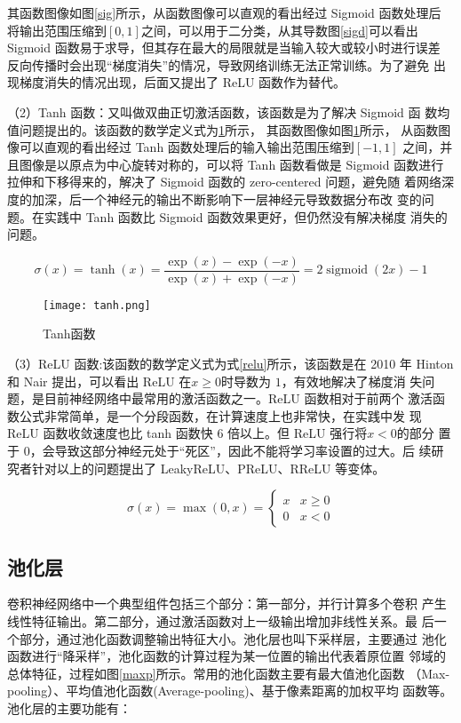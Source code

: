 其函数图像如图\ref{sig}所示，从函数图像可以直观的看出经过 Sigmoid 函数处理后
将输出范围压缩到$[0,1]$之间，可以用于二分类，从其导数图\ref{sigd}可以看出
Sigmoid 函数易于求导，但其存在最大的局限就是当输入较大或较小时进行误差
反向传播时会出现“梯度消失”的情况，导致网络训练无法正常训练。为了避免
出现梯度消失的情况出现，后面又提出了 ReLU 函数作为替代。

（2）Tanh 函数：又叫做双曲正切激活函数，该函数是为了解决 Sigmoid 函
数均值问题提出的。该函数的数学定义式为\ref{tanh}所示，
其函数图像如图\ref{tanh}所示，
从函数图像可以直观的看出经过 Tanh 函数处理后的输入输出范围压缩到$[-1,1]$
之间，并且图像是以原点为中心旋转对称的，可以将 Tanh 函数看做是 Sigmoid
函数进行拉伸和下移得来的，解决了 Sigmoid 函数的 zero-centered 问题，避免随
着网络深度的加深，后一个神经元的输出不断影响下一层神经元导致数据分布改
变的问题。在实践中 Tanh 函数比 Sigmoid 函数效果更好，但仍然没有解决梯度
消失的问题。

\begin{equation}
    \sigma(x)=\tanh (x)=\frac{\exp (x)-\exp (-x)}{\exp (x)+\exp (-x)}=2 \operatorname{sigmoid}(2 x)-1
    \label{tan}
\end{equation}

\begin{figure}[htbp]
    \centering
    \texttt{[image: tanh.png]}
    \caption{Tanh函数}
    \label{tanh}
\end{figure}

（3）ReLU 函数:该函数的数学定义式为式\ref{relu}所示，该函数是在 2010 年
Hinton 和 Nair 提出，可以看出 ReLU 在$x\ge 0$时导数为 $1$，有效地解决了梯度消
失问题，是目前神经网络中最常用的激活函数之一\cite{xu2015empirical}。ReLU 函数相对于前两个
激活函数公式非常简单，是一个分段函数，在计算速度上也非常快，在实践中发
现 ReLU 函数收敛速度也比 tanh 函数快 6 倍以上。但 ReLU 强行将$ x<0$的部分
置于 0，会导致这部分神经元处于“死区”，因此不能将学习率设置的过大。后
续研究者针对以上的问题提出了 LeakyReLU\cite{maas2013rectifier}、PReLU、RReLU 等变体。

\begin{equation}
    \sigma(x)=\max (0, x)= \begin{cases}x & x \geq 0 \\ 0 & x<0\end{cases}
    \label{relu}
\end{equation}

\subsection{池化层}
卷积神经网络中一个典型组件包括三个部分：第一部分，并行计算多个卷积
产生线性特征输出。第二部分，通过激活函数对上一级输出增加非线性关系。最
后一个部分，通过池化函数调整输出特征大小。池化层也叫下采样层，主要通过
池化函数进行“降采样”，池化函数的计算过程为某一位置的输出代表着原位置
邻域的总体特征，过程如图\ref{maxp}所示。常用的池化函数主要有最大值池化函数
（Max-pooling）、平均值池化函数(Average-pooling)、基于像素距离的加权平均
函数等。池化层的主要功能有：

